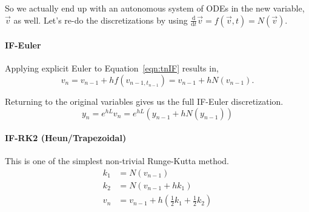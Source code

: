 \documentclass{article}
\newcommand{\ddt}{\frac{\mathrm{d}}{\mathrm{d}t}}
\theoremstyle{definition}
\begin{document}
So we actually end up with an autonomous system of ODEs in the new variable, $\vec{v}$ as well. 
Let's re-do the discretizations by using $\ddt{\vec{v}} = f(\vec{v},t)=N(\vec{v})$.

\paragraph{IF-Euler} Applying explicit Euler to Equation~\ref{eqn:tnIF} results in,
\begin{equation*}
v_n = v_{n-1} + h f(v_{n-1, t_{n-1}}) = v_{n-1} + h N(v_{n-1}). 
\end{equation*}

Returning to the original variables gives us the full IF-Euler discretization.
\begin{equation}
y_n = e^{hL}v_n =e^{hL} (y_{n-1}+hN(y_{n-1}))
\end{equation}

\paragraph{IF-RK2 (Heun/Trapezoidal)} This is one of the simplest non-trivial Runge-Kutta method. 
\begin{align*}
k_1 &= N(v_{n-1})\\
k_2 &= N(v_{n-1}+hk_1)\\
v_n &= v_{n-1} + h\left(\frac{1}{2}k_1 +\frac{1}{2}k_2\right)
\end{align*}
\end{document}
